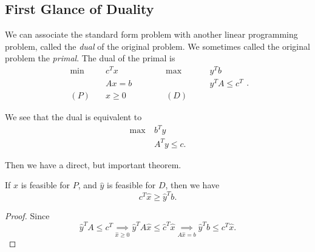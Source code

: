 \subsection{First Glance of Duality}
We can associate the standard form problem with another linear programming problem, called the \emph{dual} of the original problem.
We sometimes called the original problem the \emph{primal}. The dual of the primal is
\[
	\begin{alignedat}{5}
		\min~&c^{T}x\qquad\qquad &&\max ~ &&y^{T}b\\
		&Ax = b && &&y^{T}A\leq c^{T}\\
		(P)\quad&x\geq  0 &&(D)\quad&&
	\end{alignedat}.
\]

\begin{note}
	We see that the dual is equivalent to
	\begin{align*}
		\max~ & b^{T}y         \\
		      & A^{T}y \leq c.
	\end{align*}
\end{note}

Then we have a direct, but important theorem.
\begin{theorem}\label{Weak Duality Theorem}
	If \(\hat{x}\) is feasible for \(P\), and \(\hat{y}\) is feasible for \(D\), then we have
	\[
		c^{T}\hat{x} \geq  \hat{y}^{T} b.
	\]
\end{theorem}
\begin{proof}
	Since
	\[
		\hat{y}^{T}A\leq c^{T} \underset{\hat{x}\geq 0}{\implies} \hat{y}^{T}A \hat{x} \leq \hat{c}^{T} \hat{x} \underset{A \hat{x} = b}{\implies} \hat{y}^{T}b \leq c^{T} \hat{x}.
	\]
\end{proof}

